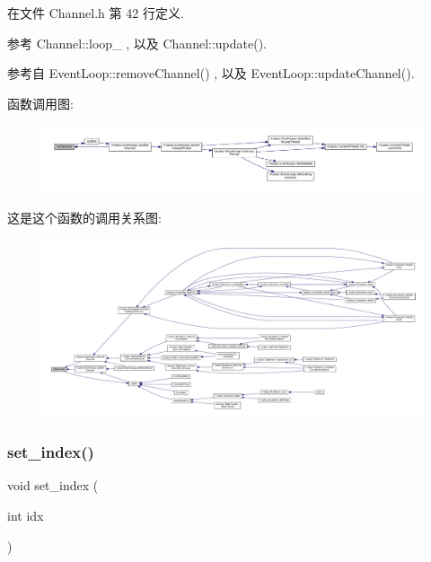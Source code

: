 在文件 Channel.\+h 第 42 行定义.



参考 Channel\+::loop\+\_\+ , 以及 Channel\+::update().



参考自 Event\+Loop\+::remove\+Channel() , 以及 Event\+Loop\+::update\+Channel().

函数调用图\+:
\nopagebreak
\begin{figure}[H]
\begin{center}
\leavevmode
\includegraphics[width=350pt]{classmuduo_1_1Channel_a2e24e2ab7ada4682fdf49cc835d85e8d_cgraph}
\end{center}
\end{figure}
这是这个函数的调用关系图\+:
\nopagebreak
\begin{figure}[H]
\begin{center}
\leavevmode
\includegraphics[width=350pt]{classmuduo_1_1Channel_a2e24e2ab7ada4682fdf49cc835d85e8d_icgraph}
\end{center}
\end{figure}
\mbox{\label{classmuduo_1_1Channel_ac9a4cd0efc3148a6fee45b2ab4f61cb6}} 
\subsubsection{\texorpdfstring{set\+\_\+index()}{set\_index()}}
{\footnotesize\ttfamily void set\+\_\+index (\begin{DoxyParamCaption}\item[{int}]{idx }\end{DoxyParamCaption})\hspace{0.3cm}{\ttfamily [inline]}}



